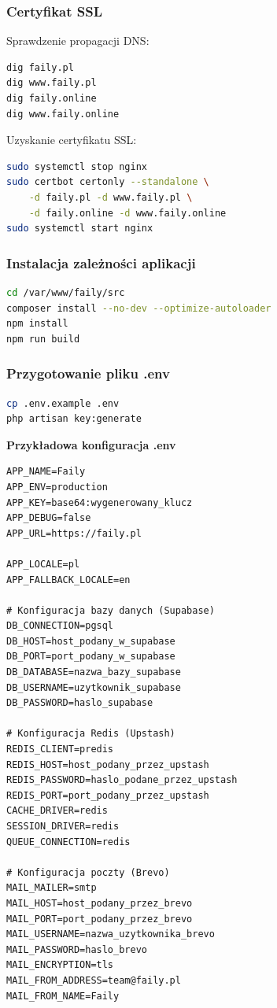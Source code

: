 \documentclass[12pt,a4paper]{article}
\begin{document}
\newpage

\subsubsection{Certyfikat SSL}

Sprawdzenie propagacji DNS:
\begin{lstlisting}[language=bash, caption=Weryfikacja DNS]
dig faily.pl
dig www.faily.pl
dig faily.online  
dig www.faily.online
\end{lstlisting}

Uzyskanie certyfikatu SSL:
\begin{lstlisting}[language=bash, caption=Instalacja certyfikatu Let's Encrypt]
sudo systemctl stop nginx
sudo certbot certonly --standalone \
    -d faily.pl -d www.faily.pl \
    -d faily.online -d www.faily.online
sudo systemctl start nginx
\end{lstlisting}

\subsubsection{Instalacja zależności aplikacji}

\begin{lstlisting}[language=bash, caption=Instalacja zależności]
cd /var/www/faily/src
composer install --no-dev --optimize-autoloader
npm install
npm run build
\end{lstlisting}

\subsubsection{Przygotowanie pliku .env}
\begin{lstlisting}[language=bash, caption=Konfiguracja środowiska]
cp .env.example .env
php artisan key:generate
\end{lstlisting}

\newpage

\textbf{Przykładowa konfiguracja .env}
\begin{lstlisting}[caption=Plik .env dla produkcji]
APP_NAME=Faily
APP_ENV=production
APP_KEY=base64:wygenerowany_klucz
APP_DEBUG=false
APP_URL=https://faily.pl

APP_LOCALE=pl
APP_FALLBACK_LOCALE=en

# Konfiguracja bazy danych (Supabase)
DB_CONNECTION=pgsql
DB_HOST=host_podany_w_supabase
DB_PORT=port_podany_w_supabase
DB_DATABASE=nazwa_bazy_supabase
DB_USERNAME=uzytkownik_supabase
DB_PASSWORD=haslo_supabase

# Konfiguracja Redis (Upstash)
REDIS_CLIENT=predis
REDIS_HOST=host_podany_przez_upstash
REDIS_PASSWORD=haslo_podane_przez_upstash
REDIS_PORT=port_podany_przez_upstash
CACHE_DRIVER=redis
SESSION_DRIVER=redis
QUEUE_CONNECTION=redis

# Konfiguracja poczty (Brevo)
MAIL_MAILER=smtp
MAIL_HOST=host_podany_przez_brevo
MAIL_PORT=port_podany_przez_brevo
MAIL_USERNAME=nazwa_uzytkownika_brevo
MAIL_PASSWORD=haslo_brevo
MAIL_ENCRYPTION=tls
MAIL_FROM_ADDRESS=team@faily.pl
MAIL_FROM_NAME=Faily
\end{lstlisting}
\end{document}
